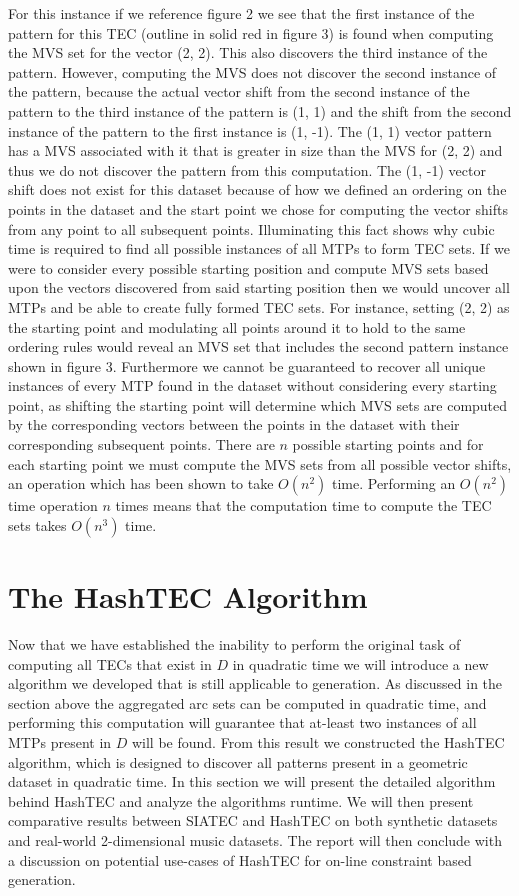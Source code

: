 \documentclass[12pt]{article}
\begin{document}
For this instance if we reference figure 2 we see that the first instance of the pattern for this TEC (outline in solid red in figure 3) is found when computing the MVS set for the vector (2, 2). This also discovers the third instance of the pattern. However, computing the MVS does not discover the second instance of the pattern, because the actual vector shift from the second instance of the pattern to the third instance of the pattern is (1, 1) and the shift from the second instance of the pattern to the first instance is (1, -1). The (1, 1) vector pattern has a MVS associated with it that is greater in size than the MVS for (2, 2) and thus we do not discover the pattern from this computation. The (1, -1) vector shift does not exist for this dataset because of how we defined an ordering on the points in the dataset and the start point we chose for computing the vector shifts from any point to all subsequent points. Illuminating this fact shows why cubic time is required to find all possible instances of all MTPs to form TEC sets. If we were to consider every possible starting position and compute MVS sets based upon the vectors discovered from said starting position then we would uncover all MTPs and be able to create fully formed TEC sets. For instance, setting (2, 2) as the starting point and modulating all points around it to hold to the same ordering rules would reveal an MVS set that includes the second pattern instance shown in figure 3. Furthermore we cannot be guaranteed to recover all unique instances of every MTP found in the dataset without considering every starting point, as shifting the starting point will determine which MVS sets are computed by the corresponding vectors between the points in the dataset with their corresponding subsequent points. There are $n$ possible starting points and for each starting point we must compute the MVS sets from all possible vector shifts, an operation which has been shown to take $O(n^2)$ time. Performing an $O(n^2)$ time operation $n$ times means that the computation time to compute the TEC sets takes $O(n^3)$ time.

\section{The HashTEC Algorithm}
Now that we have established the inability to perform the original task of computing all TECs that exist in $D$ in quadratic time we will introduce a new algorithm we developed that is still applicable to generation. As discussed in the section above the aggregated arc sets can be computed in quadratic time, and performing this computation will guarantee that at-least two instances of all MTPs present in $D$ will be found. From this result we constructed the HashTEC algorithm, which is designed to discover all patterns present in a geometric dataset in quadratic time. In this section we will present the detailed algorithm behind HashTEC and analyze the algorithms runtime. We will then present comparative results between SIATEC and HashTEC on both synthetic datasets and real-world 2-dimensional music datasets. The report will then conclude with a discussion on potential use-cases of HashTEC for on-line constraint based generation.
	
\end{document}
